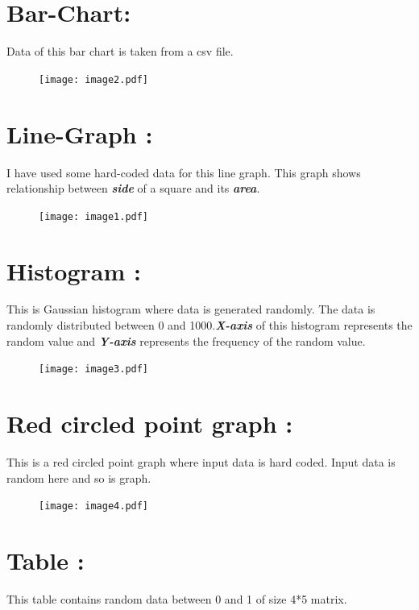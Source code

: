 \documentclass[11pt]{article}
\begin{document}
\section{Bar-Chart:}
Data of this bar chart is taken from a csv file.
 

\begin{figure}[h]
	\begin{center}
		\texttt{[image: image2.pdf]}
		
	\end{center}
\end{figure}

\section{Line-Graph :}
I have used some hard-coded data for this line graph. 
This graph shows relationship between \textbf{\textit{side }}of a square and its \textbf{\textit{area}}.
 

\begin{figure}[h]
	\begin{center}
		\texttt{[image: image1.pdf]}
		
	\end{center}
\end{figure}

\section{Histogram :}
This is Gaussian histogram where data is generated randomly. The data is randomly distributed between 0 and 1000.\textbf{\textit{X-axis}} of this histogram represents the random value and \textbf{\textit{Y-axis}} represents the frequency of the random value.
 

\begin{figure}[h]
	\begin{center}
		\texttt{[image: image3.pdf]}
		
	\end{center}
\end{figure}



\section{Red circled point graph :}
This is a red circled point graph where input data is hard coded. Input data is random here and so is graph.
 

\begin{figure}[h]
	\begin{center}
		\texttt{[image: image4.pdf]}
		
	\end{center}
\end{figure}
\section{Table : }
This table contains random data between 0 and 1 of size 4*5 matrix.\\


\end{document}

